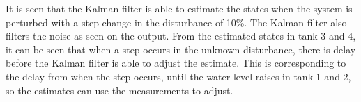 It is seen that the Kalman filter is able to estimate the states when the system is perturbed with a step change in the disturbance of 10\%. The Kalman filter also filters the noise as seen on the output. From the estimated states in tank 3 and 4, it can be seen that when a step occurs in the unknown disturbance, there is delay before the Kalman filter is able to adjust the estimate. This is corresponding to the delay from when the step occurs, until the water level raises in tank 1 and 2, so the estimates can use the measurements to adjust.